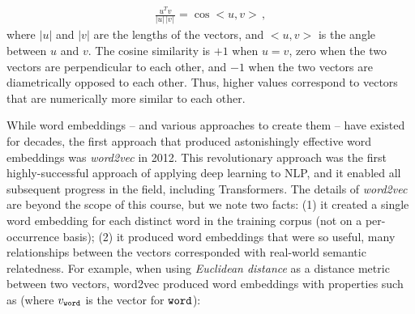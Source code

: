 



\begin{eqnarray}
  \frac{u^T v}{ |u|\, |v|\,} = \cos <u, v>
  \,,
\end{eqnarray}
where $|u|$ and $|v|$ are the lengths of the vectors, and $<u, v>$ is the angle between $u$ and $v$.  The cosine similarity is $+1$ when $u=v$, zero when the two vectors are perpendicular to each other, and $-1$ when the two vectors are diametrically opposed to each other.  Thus, higher values correspond to vectors that are numerically more similar to each other.

While word embeddings -- and various approaches to create them -- have existed for decades, the first approach that produced astonishingly effective word embeddings was {\em word2vec} in 2012. This revolutionary approach was the first highly-successful approach of applying deep learning to NLP, and it enabled all subsequent progress in the field, including Transformers. The details of {\em word2vec} are beyond the scope of this course, but we note two facts: (1) it created a single word embedding for each distinct word in the training corpus (not on a per-occurrence basis); (2) it produced word embeddings that were so useful, many relationships between the vectors corresponded with real-world semantic relatedness. For example, when using {\em Euclidean distance} as a distance metric between two vectors, word2vec produced word embeddings with properties such as (where $v_{\tt word}$ is the vector for ${\tt word}$):



